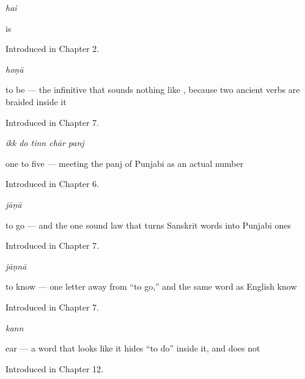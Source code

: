 \noindent\begin{minipage}[t]{\linewidth}
\raggedright
\textbf{}\enspace\emph{hai}\par
\small is\par
\footnotesize Introduced in Chapter 2.
\end{minipage}\par\medskip

\noindent\begin{minipage}[t]{\linewidth}
\raggedright
\textbf{}\enspace\emph{hoṇā}\par
\small to be — the infinitive that sounds nothing like , because two ancient verbs are braided inside it\par
\footnotesize Introduced in Chapter 7.
\end{minipage}\par\medskip

\noindent\begin{minipage}[t]{\linewidth}
\raggedright
\textbf{    }\enspace\emph{ikk do tinn chār panj}\par
\small one to five — meeting the panj of Punjabi as an actual number\par
\footnotesize Introduced in Chapter 6.
\end{minipage}\par\medskip

\noindent\begin{minipage}[t]{\linewidth}
\raggedright
\textbf{}\enspace\emph{jāṇā}\par
\small to go — and the one sound law that turns Sanskrit words into Punjabi ones\par
\footnotesize Introduced in Chapter 7.
\end{minipage}\par\medskip

\noindent\begin{minipage}[t]{\linewidth}
\raggedright
\textbf{}\enspace\emph{jāṇnā}\par
\small to know — one letter away from “to go,” and the same word as English know\par
\footnotesize Introduced in Chapter 7.
\end{minipage}\par\medskip

\noindent\begin{minipage}[t]{\linewidth}
\raggedright
\textbf{}\enspace\emph{kann}\par
\small ear — a word that looks like it hides \textquotedblleft{}to do\textquotedblright{} inside it, and does not\par
\footnotesize Introduced in Chapter 12.
\end{minipage}\par\medskip

